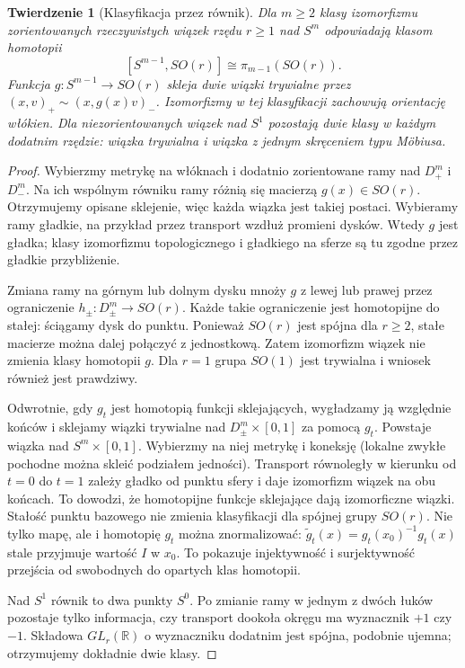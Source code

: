 \documentclass[11pt,a4paper,oneside]{report}
\newcommand{\R}{\mathbb{R}}
\theoremstyle{plain}
\newtheorem{twierdzenie}{Twierdzenie}[section]
\theoremstyle{definition}
\theoremstyle{remark}
\begin{document}
\begin{twierdzenie}[Klasyfikacja przez równik]
\label{thm:clutching-16}
Dla $m\geq2$ klasy izomorfizmu zorientowanych
rzeczywistych wiązek
rzędu $r\geq1$ nad $S^m$
odpowiadają klasom homotopii
\[
 [S^{m-1},SO(r)]
 \cong\pi_{m-1}(SO(r)).
\]
Funkcja $g:S^{m-1}\to SO(r)$
skleja dwie wiązki
trywialne przez
$(x,v)_+\sim(x,g(x)v)_-$.
Izomorfizmy w tej klasyfikacji zachowują orientację włókien.
Dla niezorientowanych
wiązek nad $S^1$ pozostają
dwie klasy w każdym dodatnim
rzędzie: wiązka trywialna
i wiązka z jednym skręceniem
typu Möbiusa.
\end{twierdzenie}
\begin{proof}
Wybierzmy metrykę na włóknach
i dodatnio zorientowane ramy
nad $D^m_+$ i $D^m_-$.
Na ich wspólnym równiku
ramy różnią się macierzą
$g(x)\in SO(r)$. Otrzymujemy
opisane sklejenie, więc
każda wiązka jest takiej
postaci. Wybieramy ramy gładkie, na przykład przez transport
wzdłuż promieni dysków. Wtedy $g$ jest gładka;
klasy izomorfizmu
topologicznego i gładkiego
na sferze są tu zgodne
przez gładkie przybliżenie.

Zmiana ramy na górnym
lub dolnym dysku mnoży
$g$ z lewej lub prawej
przez ograniczenie
$h_\pm:D^m_\pm\to SO(r)$.
Każde takie ograniczenie
jest homotopijne do stałej:
ściągamy dysk do punktu.
Ponieważ $SO(r)$ jest
spójna dla $r\geq2$,
stałe macierze można
dalej połączyć z
jednostkową. Zatem
izomorfizm wiązek
nie zmienia klasy
homotopii $g$.
Dla $r=1$ grupa $SO(1)$
jest trywialna i wniosek
również jest prawdziwy.

Odwrotnie, gdy $g_t$ jest homotopią funkcji
sklejających, wygładzamy ją względnie końców i sklejamy
wiązki trywialne nad
$D^m_\pm\times[0,1]$
za pomocą $g_t$.
Powstaje wiązka nad
$S^m\times[0,1]$.
Wybierzmy na niej
metrykę i koneksję
(lokalne zwykłe pochodne
można skleić podziałem
jedności). Transport
równoległy w kierunku
od $t=0$ do $t=1$
zależy gładko od punktu
sfery i daje izomorfizm
wiązek na obu końcach.
To dowodzi, że homotopijne
funkcje sklejające
dają izomorficzne wiązki.
Stałość punktu bazowego
nie zmienia klasyfikacji dla spójnej grupy $SO(r)$.
Nie tylko mapę, ale i homotopię $g_t$ można
znormalizować: $\widetilde g_t(x)=g_t(x_0)^{-1}g_t(x)$
stale przyjmuje wartość $I$ w $x_0$. To pokazuje
injektywność i surjektywność przejścia od swobodnych
do opartych klas homotopii.

Nad $S^1$ równik to
dwa punkty $S^0$.
Po zmianie ramy w
jednym z dwóch łuków
pozostaje tylko informacja,
czy transport dookoła
okręgu ma wyznacznik
$+1$ czy $-1$.
Składowa $GL_r(\R)$
o wyznaczniku dodatnim
jest spójna, podobnie
ujemna; otrzymujemy
dokładnie dwie klasy.
\end{proof}
\end{document}
